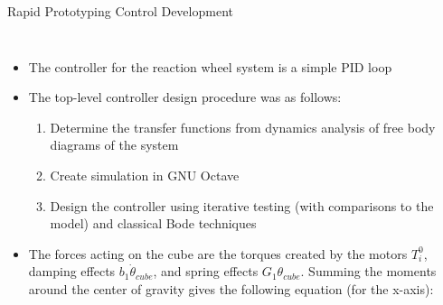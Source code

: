 \documentclass[slidestop,compress]{beamer}
\begin{document}
\begin{frame}[plain]
\begin{block}{\hspace{90 mm} Rapid Prototyping \hspace{170 mm} Control Development}
\begin{columns}
\hspace{-50 mm} 
\begin{itemize}
\item The controller for the reaction wheel system is a simple PID loop 
\item The top-level controller design procedure was as follows:
\begin{enumerate}
\item Determine the transfer functions from dynamics analysis of free body diagrams of the system
\item Create simulation in GNU Octave
\item Design the controller using iterative testing (with comparisons to the model) and classical Bode techniques
\end{enumerate}
\item The forces acting on the cube are the torques created by the motors $T_i^0$, damping effects $b_1 \dot{\theta}_{cube}$, and spring effects $G_1 \theta_{cube}$. Summing the moments around the center of gravity gives the following equation (for the x-axis):


\end{itemize}
\end{columns}
\end{block}
\end{frame}
\end{document}
